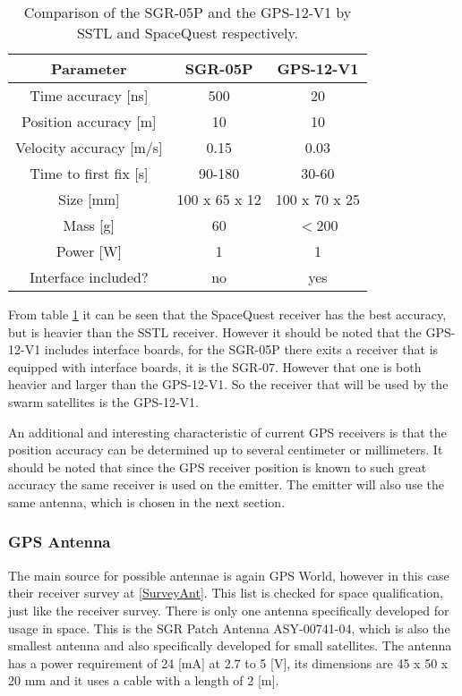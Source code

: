 \begin{table}
\centering
\begin{tabular}{c||c|c}
\textbf{Parameter} & \textbf{SGR-05P} & \textbf{GPS-12-V1} \\\hline\hline
	Time accuracy [ns] & 500 & 20 \\
	Position accuracy [m] & 10 & 10 \\
	Velocity accuracy [m/s] & 0.15 & 0.03 \\
	Time to first fix [s] & 90-180 & 30-60 \\
	Size [mm] & 100 x 65 x 12 & 100 x 70 x 25\\
	Mass [g] & 60 & $<$200 \\
	Power [W] & 1 & 1 \\
	Interface included? & no & yes \\
\end{tabular}
\caption{Comparison of the SGR-05P and the GPS-12-V1 by \acs{SSTL} and SpaceQuest respectively.}
\label{comparegps}
\end{table}

From table \ref{comparegps} it can be seen that the SpaceQuest receiver has the best accuracy, but is heavier than the \acs{SSTL} receiver. However it should be noted that the GPS-12-V1 includes interface boards, for the SGR-05P there exits a receiver that is equipped with interface boards, it is the SGR-07. However that one is both heavier and larger than the GPS-12-V1. So the receiver that will be used by the swarm satellites is the GPS-12-V1.

An additional and interesting characteristic of current \acs{GPS} receivers is that the position accuracy can be determined up to several centimeter or millimeters. It should be noted that since the \acs{GPS} receiver position is known to such great accuracy the same receiver is used on the emitter. The emitter will also use the same antenna, which is chosen in the next section.

\subsubsection{GPS Antenna}
The main source for possible antennae is again GPS World, however in this case their receiver survey at \ref{SurveyAnt}. This list is checked for space qualification, just like the receiver survey. There is only one antenna specifically developed for usage in space. This is the SGR Patch Antenna ASY-00741-04, which is also the smallest antenna and also specifically developed for small satellites.
The antenna has a power requirement of 24 [mA] at 2.7 to 5 [V], its dimensions are 45 x 50 x 20 mm and it uses a cable with a length of 2 [m].
